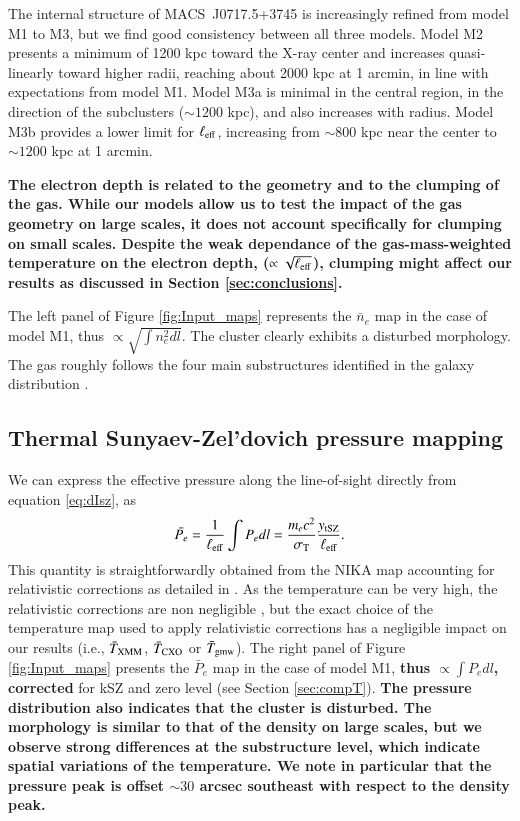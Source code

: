 \documentclass[twocolumn,traditabstract]{aa}
\begin{document}
The internal structure of \mbox{MACS~J0717.5+3745} is increasingly refined from model M1 to M3, but we find good consistency between all three models. Model M2 presents a minimum of 1200 kpc toward the X-ray center and increases quasi-linearly toward higher radii, reaching about 2000 kpc at 1 arcmin, in line with expectations from model M1. Model M3a is minimal in the central region, in the direction of the subclusters ($\sim 1200$ kpc), and also increases with radius. Model M3b provides a lower limit for $\ell_{\rm eff}$, increasing from $\sim 800$ kpc near the center to $\sim 1200$ kpc at 1 arcmin. 

{\bf The electron depth is related to the geometry and to the clumping of the gas. While our models allow us to test the impact of the gas geometry on large scales, it does not account specifically for clumping on small scales. Despite the weak dependance of the gas-mass-weighted temperature on the electron depth, ($\propto \sqrt{\ell_{\rm eff}}$), clumping might affect our results as discussed in Section \ref{sec:conclusions}.

The left panel of Figure \ref{fig:Input_maps} represents the $\bar{n}_e$ map in the case of model M1, thus $\propto \sqrt{\int n_e^2 dl}$. The cluster clearly exhibits a disturbed morphology. The gas roughly follows the four main substructures identified in the galaxy distribution \citep{Ma2009}.}

\subsection{Thermal Sunyaev-Zel'dovich pressure mapping}
We can express the effective pressure along the line-of-sight directly from equation \ref{eq:dIsz}, as
\begin{equation}
	\bar{P_e} = \frac{1}{\ell_{\rm eff}} \int P_e dl = \frac{m_e c^2}{\sigma_{\rm T}} \frac{y_{\rm tSZ}}{\ell_{\rm eff}}.
\label{eq:pseudo_p}
\end{equation}
This quantity is straightforwardly obtained from the NIKA map accounting for relativistic corrections as detailed in \cite{Adam2016b}. As the temperature can be very high, the relativistic corrections are non negligible \citep{Pointecouteau1998,Itoh2003}, but the exact choice of the temperature map used to apply relativistic corrections has a negligible impact on our results (i.e., $\bar{T}_{\rm XMM}$, $\bar{T}_{\rm CXO}$ or $\bar{T}_{\rm gmw}$). The right panel of Figure \ref{fig:Input_maps} presents the $\bar{P}_e$ map in the case of model M1, {\bf thus $\propto \int P_e dl$, corrected} for kSZ and zero level (see Section \ref{sec:compT}). {\bf The pressure distribution also indicates that the cluster is disturbed. The morphology is similar to that of the density on large scales, but we observe strong differences at the substructure level, which indicate spatial variations of the temperature. We note in particular that the pressure peak is offset $\sim 30$ arcsec southeast with respect to the density peak.}
\end{document}
